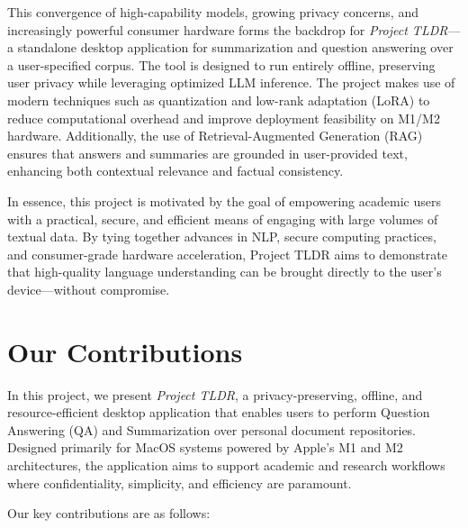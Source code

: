 This convergence of high-capability models, growing privacy concerns, and increasingly powerful consumer hardware forms the backdrop for \textit{Project TLDR}—a standalone desktop application for summarization and question answering over a user-specified corpus. The tool is designed to run entirely offline, preserving user privacy while leveraging optimized LLM inference. The project makes use of modern techniques such as quantization \cite{jacob2017quantization} and low-rank adaptation (LoRA) \cite{hu2021lora} to reduce computational overhead and improve deployment feasibility on M1/M2 hardware. Additionally, the use of Retrieval-Augmented Generation (RAG) \cite{lewis2020rag} ensures that answers and summaries are grounded in user-provided text, enhancing both contextual relevance and factual consistency.

In essence, this project is motivated by the goal of empowering academic users with a practical, secure, and efficient means of engaging with large volumes of textual data. By tying together advances in NLP, secure computing practices, and consumer-grade hardware acceleration, Project TLDR aims to demonstrate that high-quality language understanding can be brought directly to the user's device—without compromise.
\section{Our Contributions}
\label{sec:OurContributions}

In this project, we present \textit{Project TLDR}, a privacy-preserving, offline, and resource-efficient desktop application that enables users to perform Question Answering (QA) and Summarization over personal document repositories. Designed primarily for MacOS systems powered by Apple’s M1 and M2 architectures, the application aims to support academic and research workflows where confidentiality, simplicity, and efficiency are paramount.

Our key contributions are as follows:

